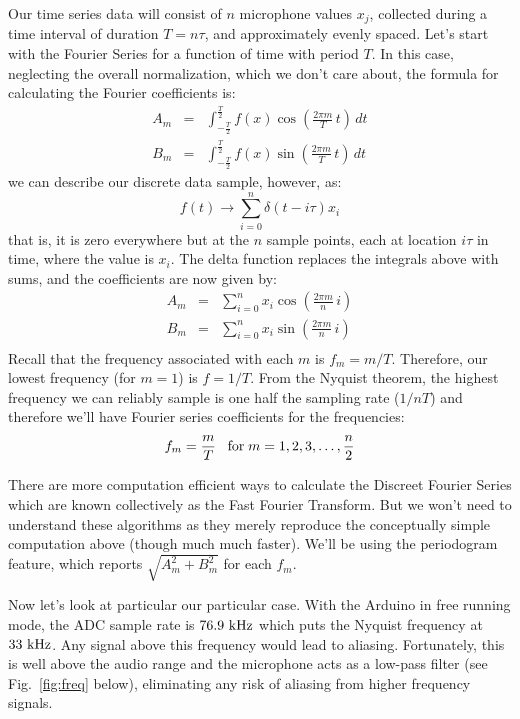 \documentclass[12pt]{article}
\begin{document}
Our time series data will consist of $n$ microphone values $x_j$, collected during a time interval of duration $T = n\tau$, and approximately evenly spaced.    Let's start with the Fourier Series for a function of time with period $T$.  In this case, neglecting the overall normalization, which we don't care about, the formula for calculating the Fourier coefficients is:
\begin{eqnarray*}
A_m &=&  \int_{-\frac{T}{2}}^{\frac{T}{2}} 
f(x) \cos\left(\frac{2\pi m}{T} \, t \right) \, dt \\
B_m &=& \int_{-\frac{T}{2}}^{\frac{T}{2}} 
f(x) \sin\left(\frac{2\pi m}{T} \, t \right) \, dt
\end{eqnarray*}
we can describe our discrete data sample, however, as:
\begin{equation*}
f(t) \to \sum_{i=0}^n \delta(t-i\tau) x_i
\end{equation*}
that is, it is zero everywhere but at the $n$ sample points, each at location $i\tau$ in time, where the value is $x_i$.
The delta function replaces the integrals above with sums, and the coefficients are now given by:
\begin{eqnarray*}
A_m &=&  \sum_{i=0}^n x_i  \cos\left(\frac{2\pi m}{n} \, i \right) \\
B_m &=&  \sum_{i=0}^n x_i  \sin\left(\frac{2\pi m}{n} \, i \right) \\
\end{eqnarray*}
Recall that the frequency associated with each $m$ is $f_m = m / T$.  Therefore, our lowest frequency (for $m=1$) is $f=1/T$.  From the Nyquist theorem, the highest frequency we can reliably sample is one half the sampling rate ($1/nT$) and therefore we'll have Fourier series coefficients for the frequencies:
\begin{displaymath}
f_m = \frac{m}{T} \; \; \; {\rm for} \; m=1,2,3,\ldots,\frac{n}{2}
\end{displaymath}

There are more computation efficient ways to calculate the Discreet Fourier Series which are known collectively as the Fast Fourier Transform.   But we won't need to understand these algorithms as they merely reproduce the conceptually simple computation above (though much much faster).  We'll be using the periodogram feature, which reports $\sqrt{A_m^2 + B_m^2}$ for each $f_m$.

Now let's look at particular our particular case.  With the Arduino in free running mode, the ADC sample rate is $76.9~\rm kHz$ which puts the Nyquist frequency at $33~\rm kHz$.  Any signal above this frequency would lead to aliasing.  Fortunately, this is well above the audio range and the microphone acts as a low-pass filter (see Fig.~\ref{fig:freq} below), eliminating any risk of aliasing from higher frequency signals.
\end{document}
